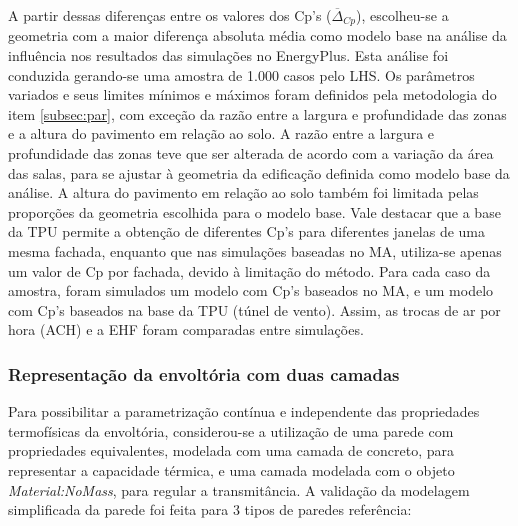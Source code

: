\documentclass[brazil,hardcopy,openany,a5paper]{ufscthesis}
\begin{document}
		A partir dessas diferenças entre os valores dos Cp's ($\overline{\Delta}_{Cp}$), escolheu-se a geometria com a maior diferença absoluta média como modelo base na análise da influência nos resultados das simulações no EnergyPlus.
		Esta análise foi conduzida gerando-se uma amostra de 1.000 casos pelo LHS.
		Os parâmetros variados e seus limites mínimos e máximos foram definidos pela metodologia do item \ref{subsec:par}, com exceção da razão entre a largura e profundidade das zonas e a altura do pavimento em relação ao solo.
		A razão entre a largura e profundidade das zonas teve que ser alterada de acordo com a variação da área das salas, para se ajustar à geometria da edificação definida como modelo base da análise.
		A altura do pavimento em relação ao solo também foi limitada pelas proporções da geometria escolhida para o modelo base.
		Vale destacar que a base da TPU permite a obtenção de diferentes Cp's para diferentes janelas de uma mesma fachada, enquanto que nas simulações baseadas no MA, utiliza-se apenas um valor de Cp por fachada, devido à limitação do método. 
		Para cada caso da amostra, foram simulados um modelo com Cp’s baseados no MA, e um modelo com Cp’s baseados na base da TPU (túnel de vento).
		Assim, as trocas de ar por hora (ACH) e a EHF foram comparadas entre simulações.
				
%		
		
		\subsubsection{Representação da envoltória com duas camadas}
		
		Para possibilitar a parametrização contínua e independente das propriedades termofísicas da envoltória, considerou-se a utilização de uma parede com propriedades equivalentes, modelada com uma camada de concreto, para representar a capacidade térmica, e uma camada modelada com o objeto \textit{Material:NoMass}, para regular a transmitância.
		A validação da modelagem simplificada da parede foi feita para 3 tipos de paredes referência:
		
\end{document}
